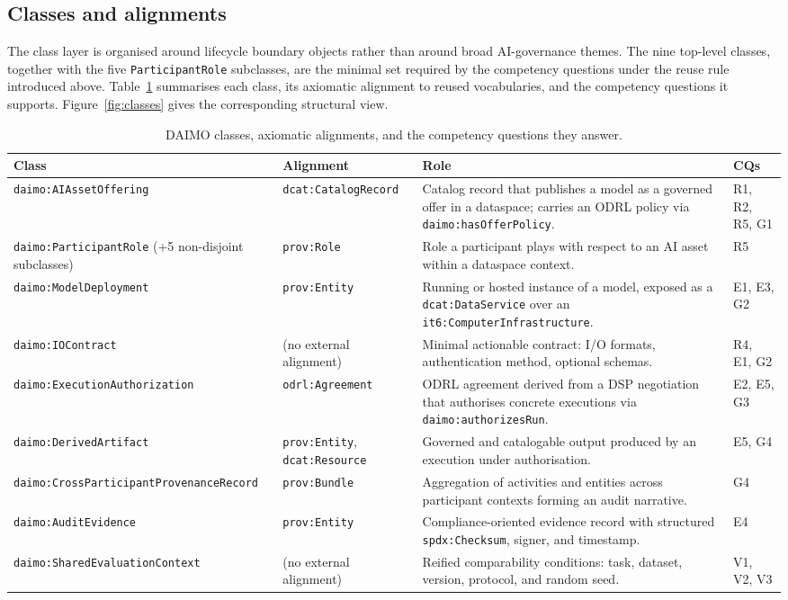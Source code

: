 \documentclass[Afour,sagev,times]{sagej}
\newcommand{\code}[1]{\texttt{#1}}
\begin{document}
\subsection{Classes and alignments}\label{sec:classes}

The class layer is organised around lifecycle boundary objects rather than around broad AI-governance themes. The nine top-level classes, together with the five \code{ParticipantRole} subclasses, are the minimal set required by the competency questions under the reuse rule introduced above. Table~\ref{tab:classes} summarises each class, its axiomatic alignment to reused vocabularies, and the competency questions it supports. Figure~\ref{fig:classes} gives the corresponding structural view.

\begin{table}[t]
\small\sf\centering
\caption{DAIMO classes, axiomatic alignments, and the competency questions they answer.\label{tab:classes}}
\begin{tabular}{@{}p{4cm}p{3cm}p{6cm}p{2.2cm}@{}}
\toprule
\textbf{Class} & \textbf{Alignment} & \textbf{Role} & \textbf{CQs} \\
\midrule
\code{daimo:AIAssetOffering} & \code{dcat:CatalogRecord} & Catalog record that publishes a model as a governed offer in a dataspace; carries an ODRL policy via \code{daimo:hasOfferPolicy}. & R1, R2, R5, G1 \\
\code{daimo:ParticipantRole} \newline (+5 non-disjoint subclasses) & \code{prov:Role} & Role a participant plays with respect to an AI asset within a dataspace context. & R5 \\
\code{daimo:ModelDeployment} & \code{prov:Entity} & Running or hosted instance of a model, exposed as a \code{dcat:DataService} over an \code{it6:ComputerInfrastructure}. & E1, E3, G2 \\
\code{daimo:IOContract} & (no external alignment) & Minimal actionable contract: I/O formats, authentication method, optional schemas. & R4, E1, G2 \\
\code{daimo:ExecutionAuthorization} & \code{odrl:Agreement} & ODRL agreement derived from a DSP negotiation that authorises concrete executions via \code{daimo:authorizesRun}. & E2, E5, G3 \\
\code{daimo:DerivedArtifact} & \code{prov:Entity}, \code{dcat:Resource} & Governed and catalogable output produced by an execution under authorisation. & E5, G4 \\
\code{daimo:CrossParticipantProvenanceRecord} & \code{prov:Bundle} & Aggregation of activities and entities across participant contexts forming an audit narrative. & G4 \\
\code{daimo:AuditEvidence} & \code{prov:Entity} & Compliance-oriented evidence record with structured \code{spdx:Checksum}, signer, and timestamp. & E4 \\
\code{daimo:SharedEvaluationContext} & (no external alignment) & Reified comparability conditions: task, dataset, version, protocol, and random seed. & V1, V2, V3 \\
\bottomrule
\end{tabular}
\end{table}
\end{document}
